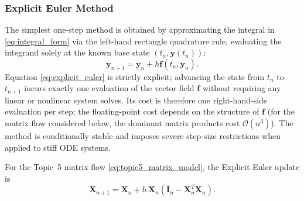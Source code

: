 \documentclass[11pt,a4paper]{article}
\theoremstyle{definition}
\theoremstyle{remark}
\begin{document}
\subsubsection{Explicit Euler Method}
The simplest one-step method is obtained by approximating the integral in \eqref{eq:integral_form} via the left-hand rectangle quadrature rule, evaluating the integrand solely at the known base state $(t_n, \mathbf{y}(t_n))$:
\begin{equation}
\label{eq:explicit_euler}
\mathbf{y}_{n+1} = \mathbf{y}_n + h \mathbf{f}(t_n, \mathbf{y}_n).
\end{equation}
Equation \eqref{eq:explicit_euler} is strictly explicit; advancing the state from $t_n$ to $t_{n+1}$ incurs exactly one evaluation of the vector field $\mathbf{f}$ without requiring any linear or nonlinear system solves. Its cost is therefore one right-hand-side evaluation per step; the floating-point cost depends on the structure of $\mathbf{f}$ (for the matrix flow considered below, the dominant matrix products cost $\mathcal{O}(n^3)$). The method is conditionally stable and imposes severe step-size restrictions when applied to stiff ODE systems.

For the Topic~5 matrix flow \eqref{eq:topic5_matrix_model}, the
Explicit Euler update is
\begin{equation}
\label{eq:topic5_explicit_euler}
\mathbf{X}_{n+1}
=
\mathbf{X}_n
+h\,\mathbf{X}_n
\left(\mathbf{I}_n-\mathbf{X}_n^T\mathbf{X}_n\right).
\end{equation}
\end{document}
